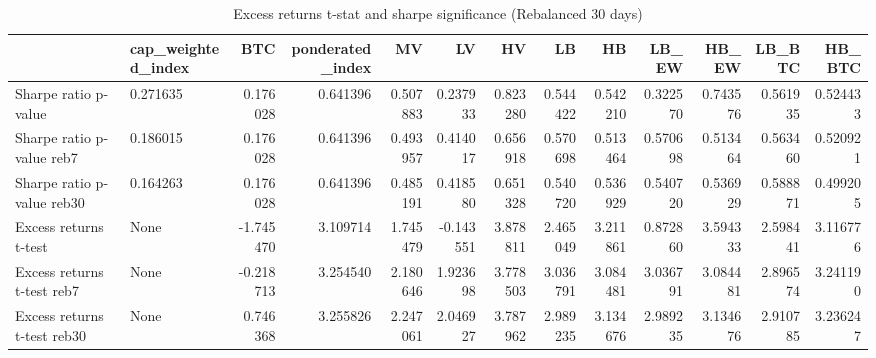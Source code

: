 \begin{table}
\centering
\caption{Excess returns t-stat and sharpe significance (Rebalanced 30 days)}
\label{signif20_30}
\begin{tabular}{llrrrrrrrrrrr}
\toprule
{} & cap\_weighted\_index &       BTC &  ponderated\_index &        MV &        LV &        HV &        LB &        HB &     LB\_EW &     HB\_EW &    LB\_BTC &    HB\_BTC \\
\midrule
Sharpe ratio p-value        &           0.271635 &  0.176028 &          0.641396 &  0.507883 &  0.237933 &  0.823280 &  0.544422 &  0.542210 &  0.322570 &  0.743576 &  0.561935 &  0.524433 \\
Sharpe ratio p-value reb7   &           0.186015 &  0.176028 &          0.641396 &  0.493957 &  0.414017 &  0.656918 &  0.570698 &  0.513464 &  0.570698 &  0.513464 &  0.563460 &  0.520921 \\
Sharpe ratio p-value reb30  &           0.164263 &  0.176028 &          0.641396 &  0.485191 &  0.418580 &  0.651328 &  0.540720 &  0.536929 &  0.540720 &  0.536929 &  0.588871 &  0.499205 \\
Excess returns t-test       &               None & -1.745470 &          3.109714 &  1.745479 & -0.143551 &  3.878811 &  2.465049 &  3.211861 &  0.872860 &  3.594333 &  2.598441 &  3.116776 \\
Excess returns t-test reb7  &               None & -0.218713 &          3.254540 &  2.180646 &  1.923698 &  3.778503 &  3.036791 &  3.084481 &  3.036791 &  3.084481 &  2.896574 &  3.241190 \\
Excess returns t-test reb30 &               None &  0.746368 &          3.255826 &  2.247061 &  2.046927 &  3.787962 &  2.989235 &  3.134676 &  2.989235 &  3.134676 &  2.910785 &  3.236247 \\
\bottomrule
\end{tabular}
\end{table}
